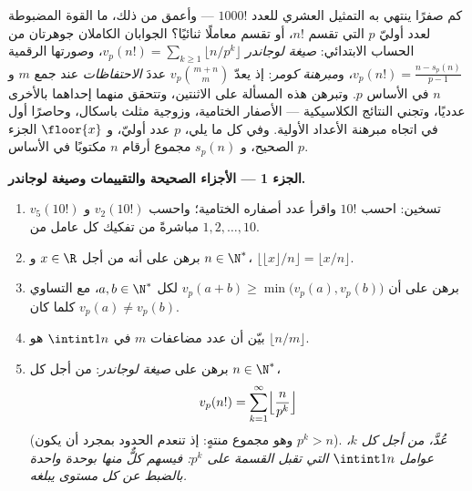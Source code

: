 \begin{problem}\label{pb:b1:arith:1}
كم صفرًا ينتهي به التمثيل العشري للعدد $1000!$ --- وأعمق من ذلك،
ما القوة المضبوطة لعدد أوليّ $p$ التي تقسم $n!$، أو تقسم
معاملًا ثنائيًا؟ الجوابان الكاملان جوهرتان من
الحساب الابتدائي: \emph{صيغة لوجاندر}
 $v_p(n!) = \sum_{k\geq1}
\lfloor n/p^k \rfloor$، وصورتها الرقمية $v_p(n!) = \frac{n
- s_p(n)}{p-1}$، و\emph{مبرهنة كومر}: إذ يعدّ $v_p\binom{m+n}m$ عددَ \emph{الاحتفاظات} عند جمع
$m$ و $n$ في الأساس $p$. وتبرهن هذه المسألة على الاثنتين، وتتحقق منهما
إحداهما بالأخرى عدديًا، وتجني النتائج الكلاسيكية
--- الأصفار الختامية، وزوجية مثلث باسكال،
وحاصرًا أول في اتجاه مبرهنة الأعداد الأولية.
وفي كل ما يلي، $p$ عدد أوليّ، و $\floor{x}$ الجزء الصحيح، و
$s_p(n)$ مجموع أرقام $n$ مكتوبًا في الأساس $p$.

\medskip
\noindent\textbf{الجزء 1 --- الأجزاء الصحيحة والتقييمات وصيغة
لوجاندر.}
\begin{enumerate}
  \item تسخين: احسب $10!$ واقرأ عدد أصفاره الختامية؛
        واحسب $v_2(10!)$ و $v_5(10!)$ مباشرةً من
        تفكيك كل عامل من $1, 2, \dots, 10$.
  \item برهن على أنه من أجل $x \in \R$ و $n \in \N^*$،
        $\bigl\lfloor \lfloor x \rfloor / n \bigr\rfloor =
        \lfloor x/n \rfloor$.
  \item برهن على أن $v_p(a + b) \geq \min\bigl(v_p(a),
        v_p(b)\bigr)$ لكل $a, b \in \N^*$، مع التساوي
        كلما كان $v_p(a) \neq v_p(b)$.
  \item بيّن أن عدد مضاعفات $m$ في $\intint1n$ هو
        $\lfloor n/m \rfloor$.
  \item برهن على \emph{صيغة لوجاندر}: من أجل كل $n \in \N^*$،
        \[
        v_p(n!) = \sum_{k=1}^{\infty}
        \Bigl\lfloor \frac{n}{p^k} \Bigr\rfloor
        \]
        (وهو مجموع منتهٍ: إذ تنعدم الحدود بمجرد أن يكون $p^k > n$).
        \emph{عُدَّ، من أجل كل $k$، عوامل $\intint1n$ التي
        تقبل القسمة على $p^k$: فيسهم كلٌّ منها بوحدة واحدة بالضبط عن كل
        مستوى يبلغه.}
\end{enumerate}


\end{problem}
